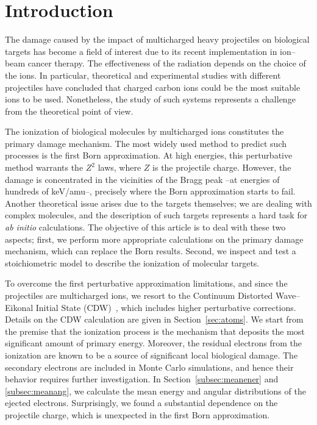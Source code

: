 \documentclass[preprint,showpacs]{revtex4}
\begin{document}

\maketitle


\section{Introduction}

The damage caused by the impact of multicharged heavy projectiles on 
biological targets has become a field of interest due to its recent 
implementation in ion--beam cancer therapy. The effectiveness of the 
radiation depends on the choice of the ions. In particular, theoretical 
and experimental studies with different projectiles have concluded that 
charged carbon ions could be the most suitable ions to be used. 
Nonetheless, the study of such systems represents a challenge from the 
theoretical point of view. 

The ionization of biological molecules by multicharged ions constitutes 
the primary damage mechanism. The most widely used method to predict
such processes is the first Born approximation. At high energies, this 
perturbative method warrants the $Z^{2}$ laws, where $Z$ is the 
projectile charge. However, the damage is concentrated in the 
vicinities of the Bragg peak --at energies of hundreds of keV/amu--, 
precisely where the Born approximation starts to fail. 
Another theoretical issue arises due to the targets themselves; we are 
dealing with complex molecules, and the description of such targets 
represents a hard task for {\it ab initio} calculations. The objective 
of this article is to deal with these two aspects; first, we perform 
more appropriate calculations on the primary damage mechanism, which can 
replace the Born results. Second, we inspect and test a stoichiometric 
model to describe the ionization of molecular targets.

To overcome the first perturbative approximation limitations, and since 
the projectiles are multicharged ions, we resort to the Continuum 
Distorted Wave--Eikonal Initial State 
(CDW)~\cite{fainstein1988,miraglia2008,miraglia2009}, which includes higher 
perturbative corrections. Details on the CDW calculation are given in 
Section~\ref{sec:atoms}.
We start from the premise that the ionization 
process is the mechanism that deposits the most significant amount of 
primary energy. Moreover, the residual electrons from the ionization 
are known to be a source of significant local biological damage. 
The secondary electrons are included in Monte Carlo simulations, 
and hence their behavior requires further investigation.
In Section~\ref{subsec:meanener} and \ref{subsec:meanang}, we calculate
the mean energy and angular distributions of the ejected electrons. 
Surprisingly, we found a substantial dependence on the projectile charge, 
which is unexpected in the first Born approximation. 
\end{document}
